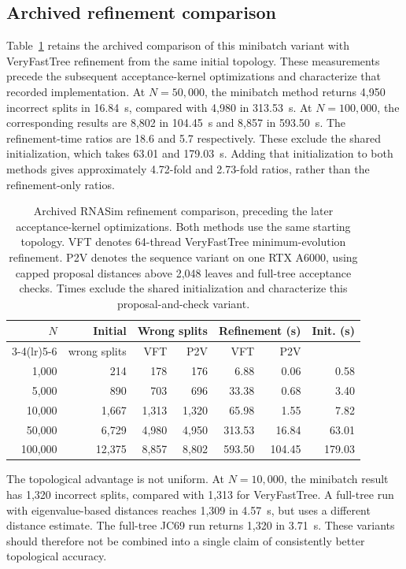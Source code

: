 \subsection{Archived refinement comparison}

Table~\ref{tab:rnasim_summary} retains the archived comparison of this minibatch variant with VeryFastTree refinement from the same initial topology.
These measurements precede the subsequent acceptance-kernel optimizations and characterize that recorded implementation.
At $N=50{,}000$, the minibatch method returns 4,950 incorrect splits in 16.84~s, compared with 4,980 in 313.53~s.
At $N=100{,}000$, the corresponding results are 8,802 in 104.45~s and 8,857 in 593.50~s.
The refinement-time ratios are 18.6 and 5.7 respectively.
These exclude the shared initialization, which takes 63.01 and 179.03~s.
Adding that initialization to both methods gives approximately 4.72-fold and 2.73-fold ratios, rather than the refinement-only ratios.

\begin{table}[tb]
\centering
\caption{Archived RNASim refinement comparison, preceding the later acceptance-kernel optimizations. Both methods use the same starting topology. VFT denotes 64-thread VeryFastTree minimum-evolution refinement. P2V denotes the sequence variant on one RTX A6000, using capped proposal distances above 2,048 leaves and full-tree acceptance checks. Times exclude the shared initialization and characterize this proposal-and-check variant.}
\label{tab:rnasim_summary}
\small
\begin{tabular}{@{}rrrrrrr@{}}
\toprule
$N$ & Initial & \multicolumn{2}{c}{Wrong splits} & \multicolumn{2}{c}{Refinement (s)} & Init. (s)\\
\cmidrule(lr){3-4}\cmidrule(lr){5-6}
 & wrong splits & VFT & P2V & VFT & P2V & \\
\midrule
1,000 & 214 & 178 & 176 & 6.88 & 0.06 & 0.58\\
5,000 & 890 & 703 & 696 & 33.38 & 0.68 & 3.40\\
10,000 & 1,667 & 1,313 & 1,320 & 65.98 & 1.55 & 7.82\\
50,000 & 6,729 & 4,980 & 4,950 & 313.53 & 16.84 & 63.01\\
100,000 & 12,375 & 8,857 & 8,802 & 593.50 & 104.45 & 179.03\\
\bottomrule
\end{tabular}
\end{table}

The topological advantage is not uniform.
At $N=10{,}000$, the minibatch result has 1,320 incorrect splits, compared with 1,313 for VeryFastTree.
A full-tree run with eigenvalue-based distances reaches 1,309 in 4.57~s, but uses a different distance estimate.
The full-tree JC69 run returns 1,320 in 3.71~s.
These variants should therefore not be combined into a single claim of consistently better topological accuracy.

